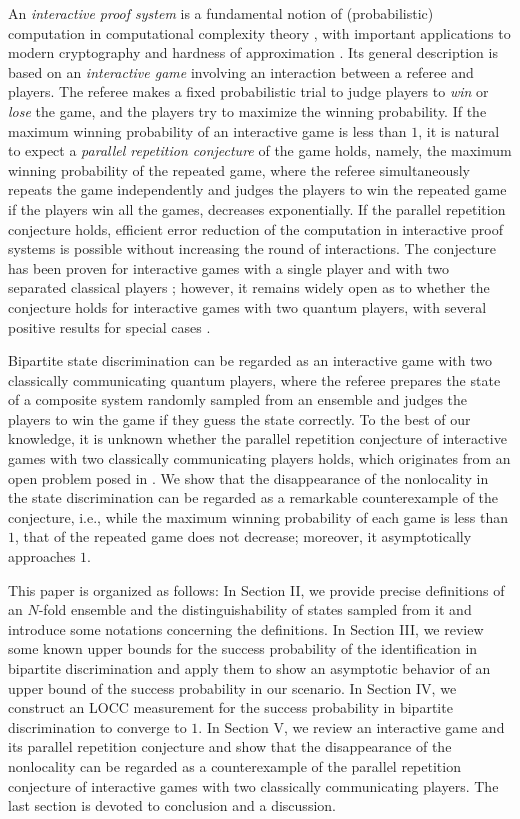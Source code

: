 \documentclass[aps,prx,twocolumn,showpacs,amsmath,notitlepage,amssymb,superscriptaddress]{revtex4-1}
\begin{document}
An {\it interactive proof system} is a fundamental notion of (probabilistic) computation in computational complexity theory \cite{AM,MIP,QIP,QMIP}, with important applications to modern cryptography \cite{ZK,QSZK} and hardness of approximation \cite{PCP1, PCP2}. Its general description is based on an {\it interactive game} \cite{quantumproofs} involving an interaction between a referee and players. The referee makes a fixed probabilistic trial to judge players to {\it win} or {\it lose} the game, and the players try to maximize the winning probability. If the maximum winning probability of an interactive game is less than $1$, it is natural to expect a {\it parallel repetition conjecture} of the game holds, namely, the maximum winning probability of the repeated game, where the referee simultaneously repeats the game independently and judges the players to win the repeated game if the players win all the games, decreases exponentially. If the parallel repetition conjecture holds, efficient error reduction of the computation in interactive proof systems is possible without increasing the round of interactions. The conjecture has been proven for interactive games with a single player \cite{KW, productrule3, quantumproofs} and with two separated classical players \cite{Raz, Holenstein}; however, it remains widely open as to whether the conjecture holds for interactive games with two quantum players, with several positive results for special cases \cite{parallelrep1, parallelrep2}.

Bipartite state discrimination can be regarded as an interactive game with two classically communicating quantum players, where the referee prepares the state of a composite system randomly sampled from an ensemble and judges the players to win the game if they guess the state correctly. To the best of our knowledge, it is unknown whether the parallel repetition conjecture of interactive games with two classically communicating players holds, which originates from an open problem posed in \cite{QMIPLOCC}. We show that the disappearance of the nonlocality in the state discrimination can be regarded as a remarkable counterexample of the conjecture, i.e., while the maximum winning probability of each game is less than $1$, that of the repeated game does not decrease; moreover, it asymptotically approaches $1$.

This paper is organized as follows: In Section II, we provide precise definitions of an $N$-fold ensemble and the distinguishability of states sampled from it and introduce some notations concerning the definitions. In Section III, we review some known upper bounds for the success probability of the identification in bipartite discrimination and apply them to show an asymptotic behavior of an upper bound of the success probability in our scenario. In Section IV, we construct an LOCC measurement for the success probability in bipartite discrimination to converge to $1$. In Section V, we review an interactive game and its parallel repetition conjecture and show that the disappearance of the nonlocality can be regarded as a counterexample of the parallel repetition conjecture of interactive games with two classically communicating players. The last section is devoted to conclusion and a discussion.
\end{document}
